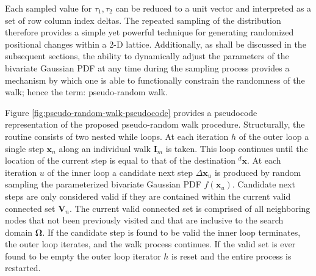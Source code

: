 Each sampled value for $\tau_1, \tau_2$ can be reduced to a unit vector and interpreted as a set of row column index deltas. The repeated sampling of the distribution therefore provides a simple yet powerful technique for generating randomized positional changes within a 2-D lattice. Additionally, as shall be discussed in the subsequent sections, the ability to dynamically adjust the parameters of the bivariate Gaussian PDF at any time during the sampling process provides a mechanism by which one is able to functionally constrain the randomness of the walk; hence the term: pseudo-random walk.
            
Figure \ref{fig:pseudo-random-walk-pseudocode} provides a pseudocode representation of the proposed pseudo-random walk procedure. Structurally, the routine consists of two nested while loops. At each iteration $h$ of the outer loop a single step $\textbf{x}_n$ along an individual walk $\textbf{I}_m$ is taken. This loop continues until the location of the current step is equal to that of the destination ${}^{d}\textbf{x}$. At each iteration $u$ of the inner loop a candidate next step $\Delta \textbf{x}_u$ is produced by random sampling the parameterized bivariate Gaussian PDF $f(\textbf{x}_u)$. Candidate next steps are only considered valid if they are contained within the current valid connected set $\textbf{V}_n$. The current valid connected set is comprised of all neighboring nodes that not been previously visited and that are inclusive to the search domain $\boldsymbol{\Omega}$.  If the candidate step is found to be valid the inner loop terminates, the outer loop iterates, and the walk process continues. If the valid set is ever found to be empty the outer loop iterator $h$ is reset and the entire process is restarted. \\
            
